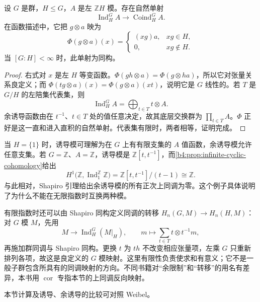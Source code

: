 \begin{proposition}\label{b4:prop:induction-coinduction-finite-index}
设 \(G\) 是群，\(H\le G\)，\(A\) 是左 \(\mathbb ZH\) 模。存在自然单射
\[
\operatorname{Ind}_H^G A\longrightarrow\operatorname{Coind}_H^G A.
\]
在函数描述中，它把 \(g\otimes a\) 映为
\[
\Phi(g\otimes a)(x)=
\begin{cases}
(xg)a,&xg\in H,\\
0,&xg\notin H.
\end{cases}
\]
当 \([G:H]<\infty\) 时，此单射为同构。
\end{proposition}
\begin{proof}
右式对 \(x\) 是左 \(H\) 等变函数。\(\Phi(gh\otimes a)=\Phi(g\otimes ha)\)，所以它对张量关系良定义；而 \(\Phi(tg\otimes a)(x)=\Phi(g\otimes a)(xt)\)，说明它是 \(G\) 线性的。若 \(T\) 是 \(G/H\) 的左陪集代表集，则
\[
\operatorname{Ind}_H^G A=\bigoplus_{t\in T}t\otimes A.
\]
余诱导函数由在 \(t^{-1}\)、\(t\in T\) 处的值任意决定，故其底层交换群为 \(\prod_{t\in T}A\)。\(\Phi\) 正好是这一直和进入直积的自然单射。代表集有限时，两者相等，证明完成。
\end{proof}

当 \(H=\{1\}\) 时，诱导模可理解为在 \(G\) 上有有限支集的 \(A\) 值函数，余诱导模允许任意支集。若 \(G=\mathbb Z\)、\(A=\mathbb Z\)，诱导模是 \(\mathbb Z[t,t^{-1}]\)，而\cref{b4:prop:infinite-cyclic-cohomology}给出
\[
H^1\bigl(\mathbb Z,\operatorname{Ind}_{1}^{\mathbb Z}\mathbb Z\bigr)
=\mathbb Z[t,t^{-1}]/(t-1)\cong\mathbb Z.
\]
与此相对，Shapiro 引理给出余诱导模的所有正次上同调为零。这个例子具体说明了为什么不能在无限指数时互换两种模。

\ProseParagraphBreak
有限指数时还可以由 Shapiro 同构定义同调的转移
\(H_n(G,M)\to H_n(H,M)\)：对 \(G\) 模 \(M\)，先用
\[
M\longrightarrow\operatorname{Ind}_H^G(M|_H),\qquad
m\longmapsto\sum_{t\in T}t\otimes t^{-1}m,
\]
再施加群同调与 Shapiro 同构。更换 \(t\) 为 \(th\) 不改变相应张量项，左乘 \(G\) 只重新排列各项，故这是良定义的 \(G\) 模映射。这里有限性负责使求和有意义；它不是一般子群包含所具有的同调映射的方向。不同书籍对“余限制”和“转移”的用名有差异，本书用 \(\operatorname{cor}\) 专指本节的上同调反向映射。

\ProseParagraphBreak
本节计算及诱导、余诱导的比较可对照 Weibel\cite[Calculation 6.2.1, Theorem 6.2.2, Shapiro's Lemma 6.3.2, Lemma 6.3.4, Application 6.3.9]{Weibel1994HomologicalAlgebra}。

